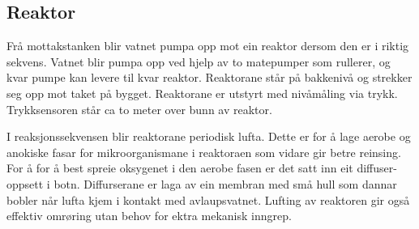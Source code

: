 \newpage
\subsection{Reaktor}

Frå mottakstanken blir vatnet pumpa opp mot ein reaktor dersom den er i riktig sekvens.
Vatnet blir pumpa opp ved hjelp av to matepumper som rullerer, og kvar pumpe kan
levere til kvar reaktor. 
Reaktorane står på bakkenivå og strekker seg opp mot taket på bygget.
Reaktorane er utstyrt med nivåmåling via trykk. Trykksensoren står ca to meter over bunn av reaktor.

I reaksjonssekvensen blir reaktorane periodisk lufta. Dette er for å lage aerobe og anokiske fasar
for mikroorganismane i reaktoraen som vidare gir betre reinsing.
For å for å best spreie oksygenet i den aerobe fasen
er det satt inn eit diffuser-oppsett i botn.
Diffurserane er laga av ein membran med små hull som dannar bobler når lufta kjem i 
kontakt med avlaupsvatnet.
Lufting av reaktoren gir også effektiv omrøring utan behov for ektra mekanisk inngrep.

